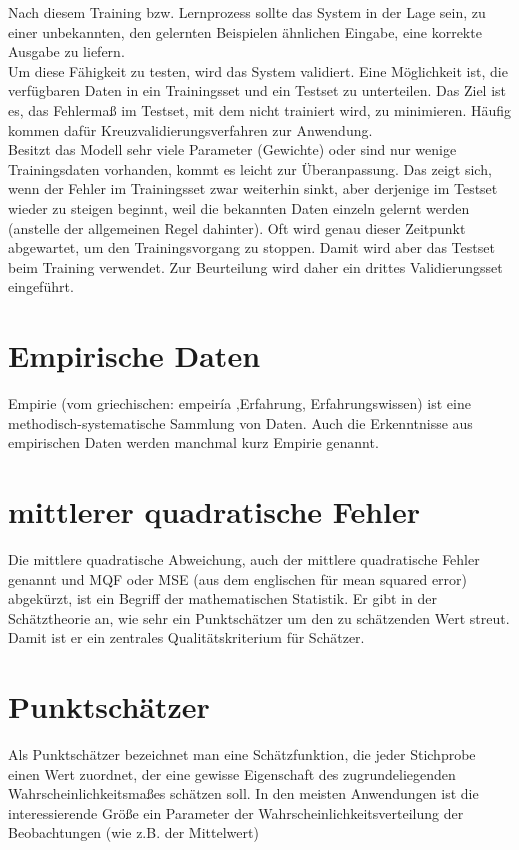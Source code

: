Nach diesem Training bzw. Lernprozess sollte das System in der Lage sein, zu einer unbekannten, den gelernten Beispielen ähnlichen Eingabe, eine korrekte Ausgabe zu liefern.\\
Um diese Fähigkeit zu testen, wird das System validiert. Eine Möglichkeit ist, die verfügbaren Daten in ein Trainingsset und ein Testset zu unterteilen. Das Ziel ist es, das Fehlermaß im Testset, mit dem nicht trainiert wird, zu minimieren. Häufig kommen dafür Kreuzvalidierungsverfahren zur Anwendung.\\
Besitzt das Modell sehr viele Parameter (Gewichte) oder sind nur wenige Trainingsdaten vorhanden, kommt es leicht zur Überanpassung. Das zeigt sich, wenn der Fehler im Trainingsset zwar weiterhin sinkt, aber derjenige im Testset wieder zu steigen beginnt, weil die bekannten Daten einzeln gelernt werden (anstelle der allgemeinen Regel dahinter). Oft wird genau dieser Zeitpunkt abgewartet, um den Trainingsvorgang zu stoppen. Damit wird aber das Testset beim Training verwendet. Zur Beurteilung wird daher ein drittes Validierungsset eingeführt.

\section{Empirische Daten}
Empirie (vom griechischen: empeiría ‚Erfahrung, Erfahrungswissen) ist eine methodisch-systematische Sammlung von Daten. Auch die Erkenntnisse aus empirischen Daten werden manchmal kurz Empirie genannt.

\section{mittlerer quadratische Fehler}
Die mittlere quadratische Abweichung, auch der mittlere quadratische Fehler genannt und MQF oder MSE (aus dem englischen für mean squared error) abgekürzt, ist ein Begriff der mathematischen Statistik. Er gibt in der Schätztheorie an, wie sehr ein Punktschätzer um den zu schätzenden Wert streut. Damit ist er ein zentrales Qualitätskriterium für Schätzer.

\section{Punktschätzer}
Als Punktschätzer bezeichnet man eine Schätzfunktion, die jeder Stichprobe einen Wert zuordnet, der eine gewisse Eigenschaft des zugrundeliegenden Wahrscheinlichkeitsmaßes schätzen soll. In den meisten Anwendungen ist die interessierende Größe ein Parameter der Wahrscheinlichkeitsverteilung der Beobachtungen (wie z.B. der Mittelwert)

